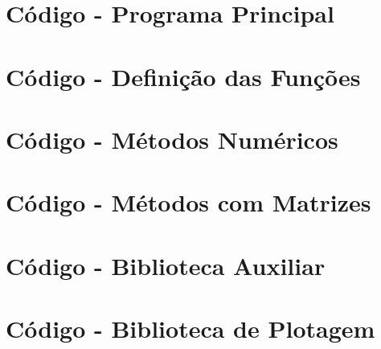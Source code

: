 \documentclass{homework}
\begin{document}
	\pagebreak
	\appendixpage
	\appendix \section*{Código - Programa Principal}
	
	\appendix \section*{Código - Definição das Funções}
	
	\appendix \section*{Código - Métodos Numéricos}
	
	\appendix \section*{Código - Métodos com Matrizes}
	
	\appendix \section*{Código - Biblioteca Auxiliar}
	
	\appendix \section*{Código - Biblioteca de Plotagem}
	
%		
\end{document}
